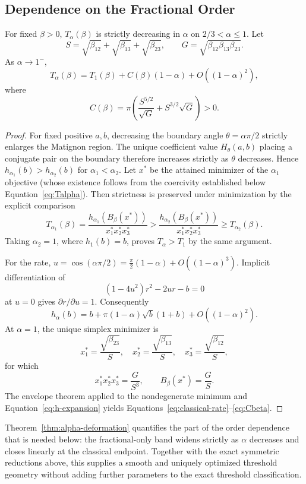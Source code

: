 \subsection{Dependence on the Fractional Order}

\begin{Theorem}\label{thm:alpha-deformation}
For fixed \(\beta>0\), \(T_\alpha(\beta)\) is strictly decreasing in \(\alpha\) on \(2/3<\alpha\le1\). Let
\[
 S=\sqrt{\beta_{12}}+\sqrt{\beta_{13}}+\sqrt{\beta_{23}},
 \qquad
 G=\sqrt{\beta_{12}\beta_{13}\beta_{23}}.
\]
As \(\alpha\to1^{-}\),
\begin{equation}
 T_\alpha(\beta)
 =
 T_1(\beta)
 +
 C(\beta)(1-\alpha)
 +
 O((1-\alpha)^2),
 \label{eq:classical-rate}
\end{equation}
where
\begin{equation}
 C(\beta)
 =
 \pi\left(
 \frac{S^{5/2}}{\sqrt G}
 +
 S^{3/2}\sqrt G
 \right)>0.
 \label{eq:Cbeta}
\end{equation}
\end{Theorem}

\begin{proof}
For fixed positive \(a,b\), decreasing the boundary angle \(\theta=\alpha\pi/2\) strictly enlarges the Matignon region. The unique coefficient value \(H_\theta(a,b)\) placing a conjugate pair on the boundary therefore increases strictly as \(\theta\) decreases. Hence \(h_{\alpha_1}(b)>h_{\alpha_2}(b)\) for \(\alpha_1<\alpha_2\). Let \(x^*\) be the attained minimizer of the \(\alpha_1\) objective (whose existence follows from the coercivity established below Equation~\eqref{eq:Talpha}). Then strictness is preserved under minimization by the explicit comparison
\[
T_{\alpha_1}(\beta)
=\frac{h_{\alpha_1}(B_\beta(x^*))}{x_1^*x_2^*x_3^*}
>\frac{h_{\alpha_2}(B_\beta(x^*))}{x_1^*x_2^*x_3^*}
\ge T_{\alpha_2}(\beta).
\]
Taking \(\alpha_2=1\), where \(h_1(b)=b\), proves \(T_\alpha>T_1\) by the same argument.

For the rate, \(u=\cos(\alpha\pi/2)=\frac{\pi}{2}(1-\alpha)+O((1-\alpha)^3)\). Implicit differentiation of
\[
 (1-4u^2)r^2-2ur-b=0
\]
at \(u=0\) gives \(\partial r/\partial u=1\). Consequently
\begin{equation}
 h_\alpha(b)
 =
 b+\pi(1-\alpha)\sqrt b(1+b)+O((1-\alpha)^2).
 \label{eq:h-expansion}
\end{equation}
At \(\alpha=1\), the unique simplex minimizer is
\[
 x_1^*=\frac{\sqrt{\beta_{23}}}{S},
 \quad
 x_2^*=\frac{\sqrt{\beta_{13}}}{S},
 \quad
 x_3^*=\frac{\sqrt{\beta_{12}}}{S},
\]
for which
\[
 x_1^*x_2^*x_3^*=\frac{G}{S^3},
 \qquad
 B_\beta(x^*)=\frac{G}{S}.
\]
The envelope theorem applied to the nondegenerate minimum and Equation~\eqref{eq:h-expansion} yields Equations~\eqref{eq:classical-rate}--\eqref{eq:Cbeta}.
\end{proof}

Theorem~\ref{thm:alpha-deformation} quantifies the part of the order dependence that is needed below: the fractional-only band widens strictly as \(\alpha\) decreases and closes linearly at the classical endpoint. Together with the exact symmetric reductions above, this supplies a smooth and uniquely optimized threshold geometry without adding further parameters to the exact threshold classification.
